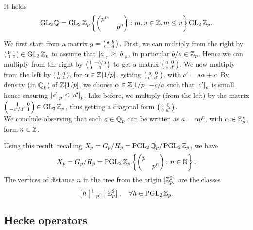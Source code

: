 \begin{nprop}
\label{prop:cartan_decom}
It holds
\[
\operatorname{GL}_{2}\mathbb{Q}=\operatorname{GL}_{2}\mathbb{Z}_{p}\left\{
\begin{pmatrix} p^{m}&\\&p^{n} \end{pmatrix}\colon m,n\in\mathbb{Z},m\leq n
\right\}
\operatorname{GL}_{2}\mathbb{Z}_{p}.
\]
\end{nprop}
\begin{prf}
We first start from a matrix $g=\left(\begin{smallmatrix} a&b\\c&d \end{smallmatrix}\right)$. First, we can multiply from the right by $\left(\begin{smallmatrix} 0&1\\1&0 \end{smallmatrix}\right)\in\operatorname{GL}_{2}\mathbb{Z}_{p}$ to assume that $\left| a\right|_{p}\geq\left| b\right|_{p}$, in particular $b/a\in\mathbb{Z}_{p}$. Hence we can multiply from the right by $\left(\begin{smallmatrix} 1&-b/a\\0&1 \end{smallmatrix}\right)$ to get a matrix $\left(\begin{smallmatrix} a&0\\c&d' \end{smallmatrix}\right)$. We now multiply from the left by $\left(\begin{smallmatrix} 1&0\\\alpha&1 \end{smallmatrix}\right)$, for $\alpha\in\mathbb{Z}[1/p]$, getting $\left(\begin{smallmatrix} a&0\\c'&d' \end{smallmatrix}\right)$, with $c'=a\alpha+c$. By density (in $\mathbb{Q}_{p}$) of $\mathbb{Z}[1/p]$, we choose $\alpha\in\mathbb{Z}[1/p]$  $-c/a$ such that $\left| c'\right|_{p}$ is small, hence ensuring $\left| c'\right|_{p}\leq \left| d'\right|_{p}$. Like before, we multiply (from the left) by the matrix $\left(\begin{smallmatrix} 1&0\\-c'/d'&1 \end{smallmatrix}\right)\in\operatorname{GL}_{2}\mathbb{Z}_{p}$, thus getting a diagonal form $\left(\begin{smallmatrix} a&0\\0&d' \end{smallmatrix}\right)$.\\
We conclude observing that each $a\in\mathbb{Q}_{p}$ can be written as $a=\alpha p^{n}$, with $\alpha\in\mathbb{Z}_{p}^{\ast}$, form $n\in\mathbb{Z}$.
\end{prf}

Using this result, recalling $X_{p}=G_{p}/H_{p}=\operatorname{PGL}_{2}\mathbb{Q}_{p}/\operatorname{PGL}_{2}\mathbb{Z}_{p}$, we have 
\[
X_{p}=G_{p}/H_{p}=\operatorname{PGL}_{2}\mathbb{Z}_{p}\left\{
\begin{pmatrix} p&\\&p^{n} \end{pmatrix}\colon n\in\mathbb{N}
\right\}.
\]
The vertices of distance $n$ in the tree from the origin $[\mathbb{Z}_{p}^{2}]$ are the classes
\[
\left[
h\left[\begin{smallmatrix} 1&\\&p^{n} \end{smallmatrix}\right]\mathbb{Z}_{p}^{2}
\right],\quad\forall h\in\operatorname{PGL}_{2}\mathbb{Z}_{p}.
\]




\subsection{Hecke operators}


